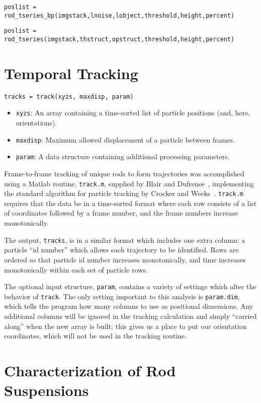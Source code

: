 \texttt{poslist = rod\_tseries\_bp(imgstack,lnoise,lobject,threshold,height,percent)}

\texttt{poslist = rod\_tseries(imgstack,thstruct,opstruct,threshold,height,percent)}

\section{Temporal Tracking}

\texttt{tracks = track(xyzs, maxdisp, param)}

\begin{itemize}
\item \texttt{xyzs}: An array containing a time-sorted list of particle positions (and, here, orientations).
\item \texttt{maxdisp}: Maximum allowed displacement of a particle between frames.
\item \texttt{param}: A data structure containing additional processing parameters.
\end{itemize}

Frame-to-frame tracking of unique rods to form trajectories was accomplished using a Matlab routine, \texttt{track.m}, 
supplied by Blair and Dufrense~\cite{blair-dufrense-matlab}, implementing the standard algorithm for particle tracking by
Crocker and Weeks~\cite{crocker-grier-spheres}.  \texttt{track.m} requires that the data be in a time-sorted format where each
row consists of a list of coordinates followed by a frame number, and the frame numbers increase monotonically.

The output, \texttt{tracks}, is in a similar format which includes one extra column: a particle ``id number'' which
allows each trajectory to be identified. Rows are ordered so that particle id number increases monotonically, and
time increases monotonically within each set of particle rows.

The optional input structure, \texttt{param}, contains a variety of settings which alter the behavior of 
\texttt{track}.  The only setting important to this analysis is \texttt{param.dim}, which tells the program how
many columns to use as positional dimensions. Any additional columns will be ignored in the tracking calculation and 
simply ``carried along'' when the new array is built; this gives us a place to put our orientation coordinates, which
will not be used in the tracking routine.

\section{Characterization of Rod Suspensions}

